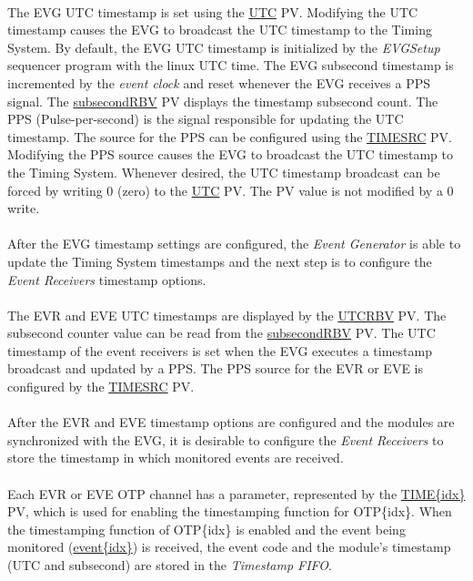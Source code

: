 \documentclass[openany]{article}
\begin{document}
		\paragraph{} The EVG UTC timestamp is set using the \hyperref[pvgroup:evre-timestamp]{UTC} PV. Modifying the UTC timestamp causes the EVG to broadcast the UTC timestamp to the Timing System. By default, the EVG UTC timestamp is initialized by the \emph{EVGSetup} sequencer program with the linux UTC time. The EVG subsecond timestamp is incremented by the \emph{event clock} and reset whenever the EVG receives a PPS signal. The \hyperref[pvgroup:evre-timestamp]{subsecondRBV} PV displays the timestamp subsecond count. The PPS (Pulse-per-second) is the signal responsible for updating the UTC timestamp. The source for the PPS can be configured using the \hyperref[pvgroup:evre-timestamp]{TIMESRC} PV. Modifying the PPS source causes the EVG to broadcast the UTC timestamp to the Timing System. Whenever desired, the UTC timestamp broadcast can be forced by writing 0 (zero) to the \hyperref[pvgroup:evre-timestamp]{UTC} PV. The PV value is not modified by a 0 write.
		\paragraph{} After the EVG timestamp settings are configured, the \emph{Event Generator} is able to update the Timing System timestamps and the next step is to configure the \emph{Event Receivers} timestamp options.
		\paragraph{} The EVR and EVE UTC timestamps are displayed by the \hyperref[pvgroup:evre-timestamp]{UTCRBV} PV. The subsecond counter value can be read from the \hyperref[pvgroup:evre-timestamp]{subsecondRBV} PV. The UTC timestamp of the event receivers is set when the EVG executes a timestamp broadcast and updated by a PPS. The PPS source for the EVR or EVE is configured by the \hyperref[pvgroup:evre-timestamp]{TIMESRC} PV.
		\paragraph{} After the EVR and EVE timestamp options are configured and the modules are synchronized with the EVG, it is desirable to configure the \emph{Event Receivers} to store the timestamp in which monitored events are received.
		\paragraph{} Each EVR or EVE OTP channel has a parameter, represented by the \hyperref[pvgroup:evre-otp]{TIME\{idx\}} PV, which is used for enabling the timestamping function for OTP\{idx\}. When the timestamping function of OTP\{idx\} is enabled and the event being monitored (\hyperref[pvgroup:evre-otp]{event\{idx\}}) is received, the event code and the module's timestamp (UTC and subsecond) are stored in the \emph{Timestamp FIFO}.
\end{document}

